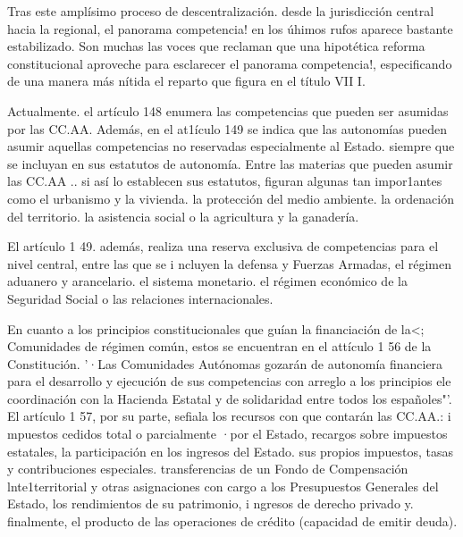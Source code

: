 \documentclass[10pt,a4paper]{article}
\begin{document}
Tras este amplísimo proceso de descentralización. desde la jurisdicción central hacia la regional, el panorama competencia! en los úhimos rufos aparece bastante estabilizado. Son muchas las voces que reclaman que una hipotética reforma constitucional aproveche para esclarecer el panorama competencia!, especificando de una manera más nítida el reparto que figura en el título VII I.

Actualmente. el artículo 148 enumera las competencias que pueden ser asumidas por las CC.AA. Además, en el at1ículo 149 se indica que las autonomías pueden asumir aquellas competencias no reservadas especialmente al Estado. siempre que se incluyan en sus estatutos de autonomía. Entre las materias que pueden asumir las CC.AA .. si así lo establecen sus estatutos, figuran algunas tan impor1antes como el urbanismo y la vivienda. la protección del medio ambiente. la ordenación del territorio. la asistencia social o la agricultura y la ganadería.

El artículo 1 49. además, realiza una reserva exclusiva de competencias para el nivel central, entre las que se i ncluyen la defensa y Fuerzas Armadas, el régimen aduanero y arancelario. el sistema monetario. el régimen económico de la Seguridad Social o las relaciones internacionales.

En cuanto a los principios constitucionales que guían la financiación de la<; Comunidades de régimen común, estos se encuentran en el attículo 1 56 de la Constitución. '·Las Comunidades Autónomas gozarán de autonomía financiera para el desarrollo y ejecución de sus competencias con arreglo a los principios ele coordinación con la Hacienda Estatal y de solidaridad entre todos los españoles"'. El artículo 1 57, por su parte, sefiala los recursos con que contarán las CC.AA.: i mpuestos cedidos total o parcialmente ·por el Estado, recargos sobre impuestos estatales, la participación en los ingresos del Estado. sus propios impuestos, tasas y contribuciones especiales. transferencias de un Fondo de Compensación lnte1territorial y otras asignaciones con cargo a los Presupuestos Generales del Estado, los rendimientos de su patrimonio, i ngresos de derecho privado y. finalmente, el producto de las operaciones de crédito (capacidad de emitir deuda).
\end{document}
